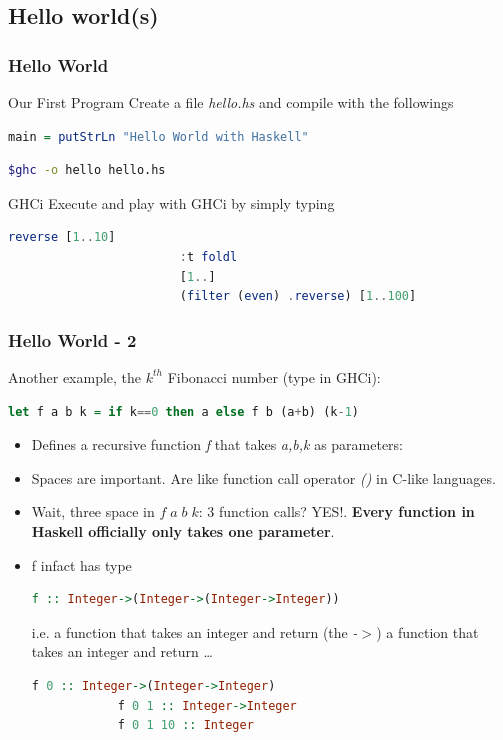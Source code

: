 \subsection{Hello world(s)}
	\begin{frame}[fragile]\frametitle{Hello World}
			\begin{block}{Our First Program}
				Create a file \emph{hello.hs} and compile with the followings
				\begin{lstlisting}[language=Haskell]
						main = putStrLn "Hello World with Haskell"
				\end{lstlisting}
				\begin{lstlisting}[language=bash]
						$ghc -o hello hello.hs
				\end{lstlisting}
			\end{block}
			\begin{block}{GHCi}
				Execute and play with GHCi by simply typing
				\begin{lstlisting}[language=Haskell]
						reverse [1..10]
						:t foldl
						[1..]
						(filter (even) .reverse) [1..100]
				\end{lstlisting}
			\end{block}
		\end{frame}
		
		\begin{frame}[fragile]\frametitle{Hello World - 2}
		Another example, the $k^{th}$ Fibonacci number (type in GHCi):
		\begin{lstlisting}[language=Haskell,xleftmargin=-1.5em]
			let f a b k = if k==0 then a else f b (a+b) (k-1)
		\end{lstlisting}
		\begin{itemize}
		  \item	Defines a recursive function \emph{f} that takes \emph{a,b,k} as parameters:
		  \item Spaces are important. Are like function call operator
		  \emph{()} in C-like languages.
		  \item Wait, three space in $f\;a\;b\;k$: 3 function
		  calls? YES!. \textbf{Every function in Haskell officially only takes one
		  parameter}. 
		  \item f infact has type
		 \begin{lstlisting}[language=Haskell,xleftmargin=-1.5em]
			f :: Integer->(Integer->(Integer->Integer))
		\end{lstlisting}
		i.e. a function that takes an integer and return (the \emph{-$>$}) a function
		that takes an integer and return \ldots
		 \begin{lstlisting}[language=Haskell,xleftmargin=-1.5em]
			f 0 :: Integer->(Integer->Integer)
			f 0 1 :: Integer->Integer
			f 0 1 10 :: Integer
		\end{lstlisting}
		
		\end{itemize}
		
		\end{frame}
		

